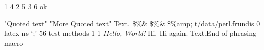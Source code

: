 1
4
2
5
3
6
ok


"Quoted text"
"More Quoted text"
Text.
\$\%\&
\$\%\&
\$\%amp;
t/data/perl.frundis
0
latex
ns
`;'
56
test-methods
1
1
\emph{Hello, World!}
Hi.
Hi again.
Text.End of phrasing macro

